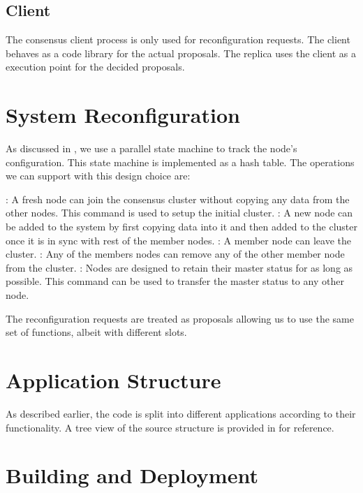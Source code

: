 \subsection{Client}

The consensus client process is only used for reconfiguration requests.
The client behaves as a code library for the actual
proposals. The replica uses the client as a execution point for the decided
proposals.

\section{System Reconfiguration}
\label{section:impl.rcfg}

As discussed in , we use a parallel state machine
to track the node's configuration. This state machine is implemented as a
hash table. The operations we can support with this design choice are:

\begin{itemize}
    : A fresh node can join the consensus cluster without copying
    any data from the other nodes. This command is used to setup the initial
    cluster.
    : A new node can be added to the system by first
    copying data into it and then added to the cluster once it is in sync with
    rest of the member nodes.
    : A member node can leave the cluster.
    : Any of the members nodes can remove any of the other member
    node from the cluster.
    : Nodes are designed to retain their master status
    for as long as possible. This command can be used to transfer the master
    status to any other node.
\end{itemize}

The reconfiguration requests are treated as proposals allowing us to use the
same set of functions, albeit with different slots.

\section{Application Structure}

As described earlier, the code is split into different applications according
to their functionality. A tree view of the source structure is provided in
 for reference.

\section{Building and Deployment}

